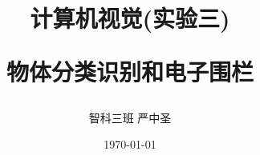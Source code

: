 \makeatletter
\newenvironment{breakablealgorithm}
{%
	\begin{center}
		\refstepcounter{algorithm}%
		\hrule height.8pt depth0pt \kern2pt%
		\renewcommand{\caption}[2][\relax]{%
			{\raggedright\textbf{\ALG@name~\thealgorithm} ##2\par}%
			\ifx\relax##1\relax %
			\addcontentsline{loa}{algorithm}{\protect\numberline{\thealgorithm}##2}%
			\else %
			\addcontentsline{loa}{algorithm}{\protect\numberline{\thealgorithm}##1}%
			\fi
			\kern2pt\hrule\kern2pt
		}
	}{%
		\kern2pt\hrule\relax%
	\end{center}
}
\makeatother
\makeatletter
\newcommand{\rmnum}[1]{\romannumeral #1}
\newcommand{\Rmnum}[1]{\expandafter\@slowromancap\romannumeral #1@}
\makeatother

\documentclass[11pt,a4paper]{ctexart}
\usepackage{fontspec}
\usepackage{xeCJK}%
\usepackage{subfigure}
\usepackage{xunicode}
\usepackage{xltxtra}
\usepackage{amsmath}
\usepackage{amsfonts}
\usepackage{amssymb}
\usepackage{graphicx}
\usepackage{hyperref}
\usepackage{amsthm}
\usepackage{array}
\usepackage{tcolorbox}
\usepackage{float}   %
\usepackage{booktabs}  %
\usepackage[titletoc]{appendix}
\usepackage{algorithm}  
\usepackage{algorithmic}  
\usepackage{listings}
\usepackage{xcolor}
\setmonofont{Consolas}%

\hypersetup{
	colorlinks=true,
	linkcolor=black
}
\usepackage[left=2cm,right=2cm,top=2cm,bottom=2cm]{geometry}
\newtheorem*{solution}{解}
\newtheorem{cor}{推论}
\newtheorem{e}{习题}
\title{计算机视觉(实验三)
	
	物体分类识别和电子围栏}
\author{智科三班 \quad 严中圣 }
\date{\today}

